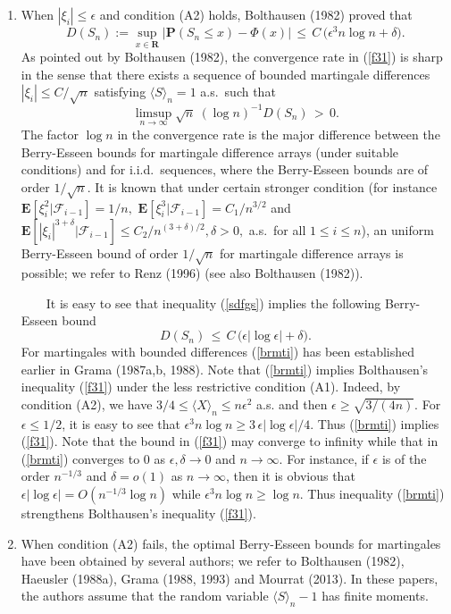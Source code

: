 \documentclass{gSTA2e}
\theoremstyle{plain}
\theoremstyle{definition}
\theoremstyle{remark}
\begin{document}
\begin{enumerate}
\item When $|\xi_{i}|\leq \epsilon$ and  condition  (A2) holds,  Bolthausen (1982)  proved that
\begin{equation}\label{f31}
D(S_n)  := \sup_{x \in \mathbf{R}} \Big|\mathbf{P}(S_n\leq x) - \Phi(x) \Big| \, \leq  \,  C  \,\Big(\epsilon^3 n  \log n  +\delta \Big).
\end{equation}
As pointed out by Bolthausen (1982), the  convergence rate in (\ref{f31}) is sharp in the sense that there exists a sequence of  bounded martingale differences $|\xi_i|\leq C/\sqrt{n}$ satisfying  $\langle S\rangle_{n}=1$ a.s.\ such that
\begin{equation}
\limsup_{n\rightarrow \infty} \sqrt{n}\  (\log n)^{-1} D(S_n)  \, >  \, 0.
\label{optim001}
\end{equation}
The factor $\log n$ in the convergence rate is the major difference between the Berry-Esseen bounds for
 martingale difference arrays (under suitable conditions) and for i.i.d.\ sequences, where the Berry-Esseen bounds are of order $ 1/\sqrt{n}$.
It is known that under certain stronger condition (for instance $\mathbf{E}[\xi _i^2|\mathcal{F}
_{i-1}]=1/n,$  $\mathbf{E}[\xi _i^3|\mathcal{F}
_{i-1}]=C_1/n^{3/2}$ and $\mathbf{E}[|\xi _i|^{3+\delta}|\mathcal{F}
_{i-1}]\leq C_2/n^{(3+\delta)/2}, \delta> 0,$ a.s.\ for all $1\leq i \leq n$),  an uniform Berry-Esseen bound of
order $1/\sqrt{n}$ for  martingale difference arrays is possible; we refer to Renz (1996) (see also Bolthausen (1982)).


\ \ \ \ It is easy to see that inequality (\ref{sdfgs}) implies the following Berry-Esseen bound
\begin{equation}\label{brmti}
D(S_n)    \, \leq \,  C\,\Big( \epsilon \left| \log  \epsilon \right|+\delta \Big).
\end{equation}
For martingales with bounded differences (\ref{brmti}) has been established earlier in Grama (1987a,b, 1988).
Note that (\ref{brmti}) implies Bolthausen's inequality (\ref{f31}) under the less restrictive condition (A1).
Indeed, by condition (A2), we have $3/4 \leq \langle X \rangle_n \leq n \epsilon ^2$ a.s. and then $\epsilon \geq \sqrt{3/(4n)}$. For $\epsilon \leq 1/2$, it is easy to see that $\epsilon^3 n   \log n  \geq 3\,\epsilon|\log\epsilon | /4$.
Thus (\ref{brmti}) implies (\ref{f31}).
Note that the bound in (\ref{f31}) may converge to infinity while that in (\ref{brmti}) converges to $0$ as $\epsilon, \delta \to 0$ and $n \to \infty.$
 For instance, if $\epsilon$ is of the order $n^{-1/3}$ and $\delta=o(1)$ as $n \to \infty$, then it is obvious that $\epsilon \left| \log  \epsilon \right|=O(n^{-1/3} \log n  )$ while $\epsilon^3 n  \log n  \geq \log n.$ Thus inequality (\ref{brmti}) strengthens  Bolthausen's inequality (\ref{f31}).

\item When  condition (A2) fails,  the optimal Berry-Esseen bounds for martingales have been obtained by several authors; we refer to  Bolthausen (1982), Haeusler (1988a),  Grama (1988, 1993) and Mourrat (2013). In these papers, the authors assume that the random variable $\langle S\rangle_{n}-1$ has finite moments.
\end{enumerate}
\end{document}
